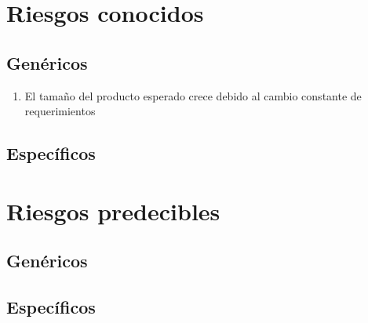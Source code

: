 \section{Riesgos conocidos}
\subsection{Genéricos}
\begin{enumerate}
 \item El tamaño del producto esperado crece debido al cambio constante de requerimientos
\end{enumerate}

\subsection{Específicos}


\section{Riesgos predecibles}
\subsection{Genéricos}
\subsection{Específicos}

